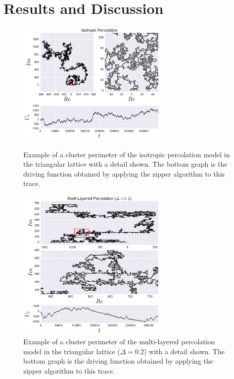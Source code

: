 \section{Results and Discussion}
\label{sec:scaling}

\begin{figure}
\begin{center}
    \includegraphics[width=0.65\textwidth]{chapters/ch6-asle/figs/ip_trdr}
\end{center}
\caption{Example of a cluster perimeter of the isotropic percolation model in
    the triangular lattice with a detail shown. The bottom graph is the driving
    function obtained by applying the zipper algorithm to this trace.}
\label{fig:ip_trdr}

\begin{center}
    \includegraphics[width=0.65\textwidth]{chapters/ch6-asle/figs/ml_trdr}
\end{center}
\caption{Example of a cluster perimeter of the multi-layered percolation model
    in the triangular lattice ($\Delta=0.2$) with a detail shown. The bottom
    graph is the driving function obtained by applying the zipper algorithm to
    this trace.}
\label{fig:ml_trdr}
\end{figure}

